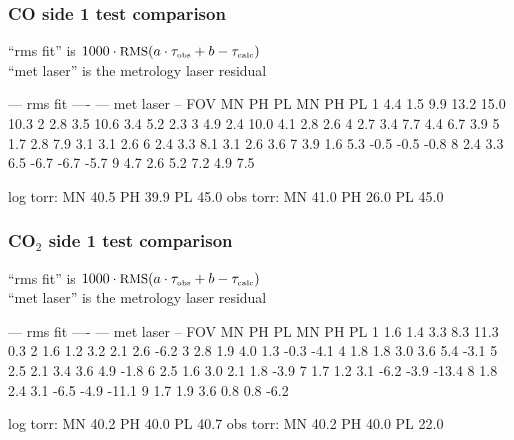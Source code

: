 \documentclass[11pt]{beamer}
\begin{document}
\begin{frame}[fragile]
\frametitle{CO side 1 test comparison}

``rms fit'' is $1000 \cdot \mbox{\small RMS}(a\cdot\tau_{\mbox{\tiny obs}} + b - \tau_{\mbox{\tiny calc}})$ \\
``met laser'' is the  metrology laser residual

\begin{semiverbatim}\small
          --- rms fit ----        --- met laser --
  FOV    MN      PH      PL      MN      PH      PL  
   1     4.4     1.5     9.9    13.2    15.0    10.3
   2     2.8     3.5    10.6     3.4     5.2     2.3
   3     4.9     2.4    10.0     4.1     2.8     2.6
   4     2.7     3.4     7.7     4.4     6.7     3.9
   5     1.7     2.8     7.9     3.1     3.1     2.6
   6     2.4     3.3     8.1     3.1     2.6     3.6
   7     3.9     1.6     5.3    -0.5    -0.5    -0.8
   8     2.4     3.3     6.5    -6.7    -6.7    -5.7
   9     4.7     2.6     5.2     7.2     4.9     7.5

log torr: MN 40.5 PH 39.9 PL 45.0
obs torr: MN 41.0 PH 26.0 PL 45.0
\end{semiverbatim}

\end{frame}
\begin{frame}[fragile]
\frametitle{CO$_2$ side 1 test comparison}

``rms fit'' is $1000 \cdot \mbox{\small RMS}(a\cdot\tau_{\mbox{\tiny obs}} + b - \tau_{\mbox{\tiny calc}})$ \\
``met laser'' is the metrology laser residual

\begin{semiverbatim}\small
          --- rms fit ----        --- met laser --
  FOV    MN      PH      PL      MN      PH      PL  
   1     1.6     1.4     3.3     8.3    11.3     0.3
   2     1.6     1.2     3.2     2.1     2.6    -6.2
   3     2.8     1.9     4.0     1.3    -0.3    -4.1
   4     1.8     1.8     3.0     3.6     5.4    -3.1
   5     2.5     2.1     3.4     3.6     4.9    -1.8
   6     2.5     1.6     3.0     2.1     1.8    -3.9
   7     1.7     1.2     3.1    -6.2    -3.9   -13.4
   8     1.8     2.4     3.1    -6.5    -4.9   -11.1
   9     1.7     1.9     3.6     0.8     0.8    -6.2

log torr: MN 40.2 PH 40.0 PL 40.7
obs torr: MN 40.2 PH 40.0 PL 22.0
\end{semiverbatim}

\end{frame}
\end{document}
